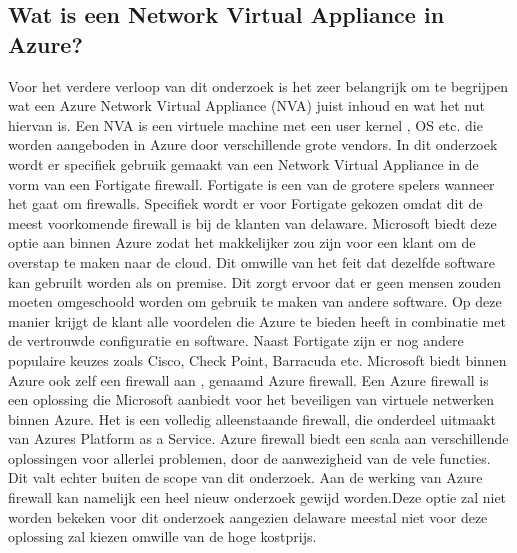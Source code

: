 \subsection{Wat is een Network Virtual Appliance in Azure?}
Voor het verdere verloop van dit onderzoek is het zeer belangrijk om te begrijpen wat een Azure Network Virtual Appliance (NVA) juist inhoud en wat het nut hiervan is. Een NVA is een virtuele machine met een user kernel , OS etc. die worden aangeboden in Azure door verschillende grote vendors. In dit onderzoek wordt er specifiek gebruik gemaakt van een Network Virtual Appliance in de vorm van een Fortigate firewall. Fortigate is een van de grotere spelers wanneer het gaat om firewalls. Specifiek wordt er voor Fortigate gekozen omdat dit de meest voorkomende firewall is bij de klanten van delaware. Microsoft biedt deze optie aan binnen Azure zodat het makkelijker zou zijn voor een klant om de overstap te maken naar de cloud. Dit omwille van het feit dat dezelfde software kan gebruilt worden als on premise. Dit zorgt ervoor dat er geen mensen zouden moeten omgeschoold worden om gebruik te maken van andere software. Op deze manier krijgt de klant alle voordelen die Azure te bieden heeft in combinatie met de vertrouwde configuratie en software. Naast Fortigate zijn er nog andere populaire keuzes zoals Cisco, Check Point, Barracuda etc. 
Microsoft biedt binnen Azure ook zelf een firewall aan , genaamd Azure firewall. Een Azure firewall is een oplossing die Microsoft aanbiedt voor het beveiligen van virtuele netwerken binnen Azure. \autocite{Cooke} Het is een volledig alleenstaande firewall, die onderdeel uitmaakt van Azures Platform as a Service. \newline \autocite{Seferlis2018} Azure firewall biedt een scala aan verschillende oplossingen voor allerlei problemen, door de aanwezigheid van de vele functies. Dit valt echter buiten de scope van dit onderzoek. Aan de werking van Azure firewall kan namelijk een heel nieuw onderzoek gewijd worden.Deze optie zal niet worden bekeken voor dit onderzoek aangezien delaware meestal niet voor deze oplossing zal kiezen omwille van de hoge kostprijs.
